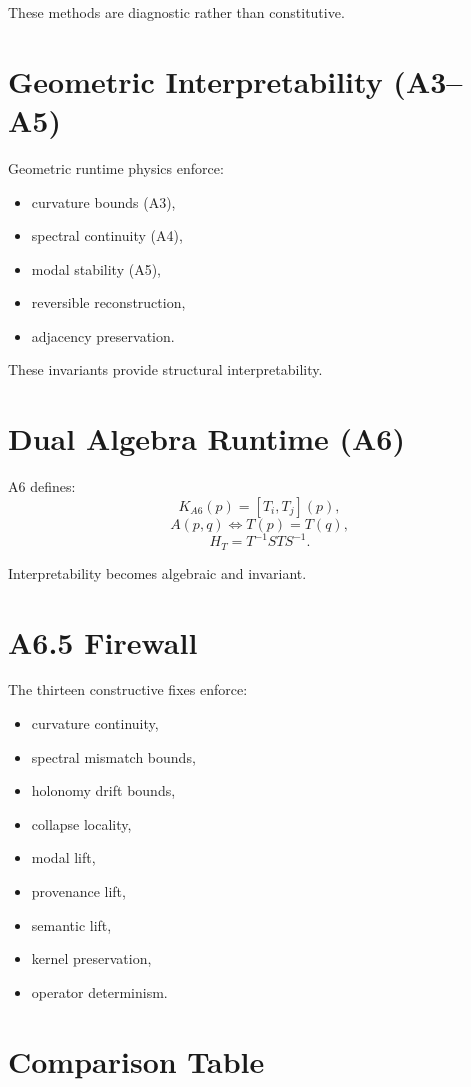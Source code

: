 \documentclass[11pt]{article}
\begin{document}
These methods are diagnostic rather than constitutive.

\section{Geometric Interpretability (A3--A5)}

Geometric runtime physics enforce:
\begin{itemize}
  \item curvature bounds (A3),
  \item spectral continuity (A4),
  \item modal stability (A5),
  \item reversible reconstruction,
  \item adjacency preservation.
\end{itemize}

These invariants provide structural interpretability.

\section{Dual Algebra Runtime (A6)}

A6 defines:
\[
K_{A6}(p) = [T_i, T_j](p),
\]
\[
A(p,q) \iff T(p) = T(q),
\]
\[
H_T = T^{-1} S T S^{-1}.
\]

Interpretability becomes algebraic and invariant.

\section{A6.5 Firewall}

The thirteen constructive fixes enforce:
\begin{itemize}
  \item curvature continuity,
  \item spectral mismatch bounds,
  \item holonomy drift bounds,
  \item collapse locality,
  \item modal lift,
  \item provenance lift,
  \item semantic lift,
  \item kernel preservation,
  \item operator determinism.
\end{itemize}

\section{Comparison Table}
\end{document}
